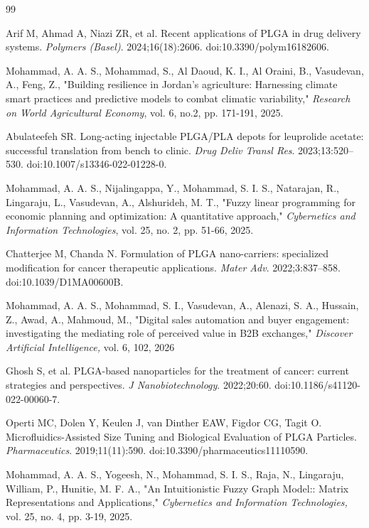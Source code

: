 \documentclass[10pt]{NSP1}
\begin{document}
\begin{thebibliography}{99}

 Arif M, Ahmad A, Niazi ZR, et al. Recent applications of PLGA in drug delivery
systems. \textit{Polymers (Basel)}. 2024;16(18):2606. doi:10.3390/polym16182606.

Mohammad, A. A. S., Mohammad, S., Al Daoud, K. I., Al Oraini, B., Vasudevan, A., Feng, Z., "Building resilience in Jordan’s agriculture: Harnessing climate smart practices and predictive models to combat climatic variability," \emph{Research on World Agricultural Economy}, vol. 6, no.2, pp. 171-191, 2025.


 Abulateefeh SR. Long-acting injectable PLGA/PLA depots for leuprolide acetate:
successful translation from bench to clinic. \textit{Drug Deliv Transl Res}. 2023;13:520--530.
doi:10.1007/s13346-022-01228-0.

Mohammad, A. A. S., Nijalingappa, Y., Mohammad, S. I. S., Natarajan, R., Lingaraju, L., Vasudevan, A., Alshurideh, M. T., "Fuzzy linear programming for economic planning and optimization: A quantitative approach," \emph{Cybernetics and Information Technologies}, vol. 25, no. 2, pp. 51-66, 2025.


 Chatterjee M, Chanda N. Formulation of PLGA nano-carriers: specialized modification
for cancer therapeutic applications. \textit{Mater Adv}. 2022;3:837--858. doi:10.1039/D1MA00600B.

Mohammad, A. A. S., Mohammad, S. I., Vasudevan, A., Alenazi, S. A., Hussain, Z., Awad, A.,  Mahmoud, M., "Digital sales automation and buyer engagement: investigating the mediating role of perceived value in B2B exchanges," \emph{Discover Artificial Intelligence,} vol. 6, 102, 2026


 Ghosh S, et al. PLGA-based nanoparticles for the treatment of cancer: current
strategies and perspectives. \textit{J Nanobiotechnology}. 2022;20:60.
doi:10.1186/s41120-022-00060-7.

 Operti MC, Dolen Y, Keulen J, van Dinther EAW, Figdor CG, Tagit O.
Microfluidics-Assisted Size Tuning and Biological Evaluation of PLGA Particles.
\textit{Pharmaceutics}. 2019;11(11):590. doi:10.3390/pharmaceutics11110590.

Mohammad, A. A. S., Yogeesh, N., Mohammad, S. I. S., Raja, N., Lingaraju, William, P., Hunitie, M. F. A., "An Intuitionistic Fuzzy Graph Model:: Matrix Representations and Applications," \emph{Cybernetics and Information Technologies,} vol. 25, no. 4, pp. 3-19, 2025.



\end{thebibliography}
\end{document}

